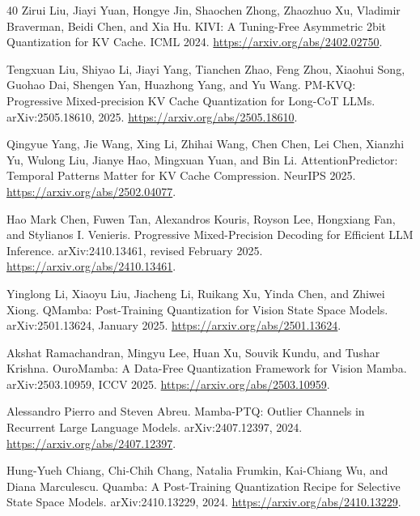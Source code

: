 \documentclass{article}
\begin{document}
\begin{thebibliography}{40}
Zirui Liu, Jiayi Yuan, Hongye Jin, Shaochen Zhong, Zhaozhuo Xu, Vladimir
Braverman, Beidi Chen, and Xia Hu.
\newblock KIVI: A Tuning-Free Asymmetric 2bit Quantization for KV Cache.
\newblock ICML 2024.
\newblock \url{https://arxiv.org/abs/2402.02750}.

Tengxuan Liu, Shiyao Li, Jiayi Yang, Tianchen Zhao, Feng Zhou, Xiaohui Song,
Guohao Dai, Shengen Yan, Huazhong Yang, and Yu Wang.
\newblock PM-KVQ: Progressive Mixed-precision KV Cache Quantization for
Long-CoT LLMs.
\newblock arXiv:2505.18610, 2025.
\newblock \url{https://arxiv.org/abs/2505.18610}.

Qingyue Yang, Jie Wang, Xing Li, Zhihai Wang, Chen Chen, Lei Chen, Xianzhi
Yu, Wulong Liu, Jianye Hao, Mingxuan Yuan, and Bin Li.
\newblock AttentionPredictor: Temporal Patterns Matter for KV Cache
Compression.
\newblock NeurIPS 2025.
\newblock \url{https://arxiv.org/abs/2502.04077}.

Hao Mark Chen, Fuwen Tan, Alexandros Kouris, Royson Lee, Hongxiang Fan, and
Stylianos I. Venieris.
\newblock Progressive Mixed-Precision Decoding for Efficient LLM Inference.
\newblock arXiv:2410.13461, revised February 2025.
\newblock \url{https://arxiv.org/abs/2410.13461}.

Yinglong Li, Xiaoyu Liu, Jiacheng Li, Ruikang Xu, Yinda Chen, and Zhiwei
Xiong.
\newblock QMamba: Post-Training Quantization for Vision State Space Models.
\newblock arXiv:2501.13624, January 2025.
\newblock \url{https://arxiv.org/abs/2501.13624}.

Akshat Ramachandran, Mingyu Lee, Huan Xu, Souvik Kundu, and Tushar Krishna.
\newblock OuroMamba: A Data-Free Quantization Framework for Vision Mamba.
\newblock arXiv:2503.10959, ICCV 2025.
\newblock \url{https://arxiv.org/abs/2503.10959}.

Alessandro Pierro and Steven Abreu.
\newblock Mamba-PTQ: Outlier Channels in Recurrent Large Language Models.
\newblock arXiv:2407.12397, 2024.
\newblock \url{https://arxiv.org/abs/2407.12397}.

Hung-Yueh Chiang, Chi-Chih Chang, Natalia Frumkin, Kai-Chiang Wu, and Diana
Marculescu.
\newblock Quamba: A Post-Training Quantization Recipe for Selective State
Space Models.
\newblock arXiv:2410.13229, 2024.
\newblock \url{https://arxiv.org/abs/2410.13229}.


\end{thebibliography}
\end{document}
